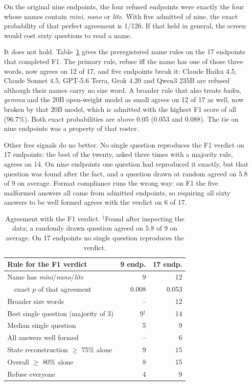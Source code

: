 \documentclass[11pt]{article}
\begin{document}
On the original nine endpoints, the four refused endpoints were exactly the four
whose names contain \textit{mini}, \textit{nano} or \textit{lite}. With five
admitted of nine, the exact probability of that perfect agreement is 1/126.
If that held in general, the screen would cost sixty questions to read a
name.

It does not hold. Table~\ref{tab:baselines} gives the preregistered name rules
on the 17 endpoints that completed F1. The primary rule, refuse iff the name
has one of those three words, now agrees on 12 of 17, and five endpoints break
it: Claude Haiku 4.5, Claude Sonnet 4.5, GPT-5.6 Terra, Grok 4.20 and
Qwen3 235B are refused although their names carry no size word. A broader rule
that also treats \textit{haiku}, \textit{gemma} and the 20B open-weight model
as small agrees on 12 of 17 as well, now broken by that 20B model, which is
admitted with the highest F1 score of all (96.7\%). Both exact probabilities
are above 0.05 (0.053 and 0.088). The tie on nine endpoints was a property of
that roster.

Other free signals do no better. No single question reproduces the F1 verdict
on 17 endpoints: the best of the twenty, asked three times with a majority rule,
agrees on 14. On nine endpoints one question had reproduced it exactly, but
that question was found after the fact, and a question drawn at random agreed
on 5.8 of 9 on average. Format compliance runs the wrong way: on F1 the five
malformed answers all came from admitted endpoints, so requiring all sixty
answers to be well formed agrees with the verdict on 6 of 17.

\begin{table}[t]
  \centering
  \small
  \setlength{\tabcolsep}{4pt}
  \begin{tabular}{@{}lrr@{}}
    \toprule
    Rule for the F1 verdict & 9 endp. & 17 endp. \\
    \midrule
    Name has \textit{mini}/\textit{nano}/\textit{lite} & 9 & 12 \\
    \ \ exact $p$ of that agreement & 0.008 & 0.053 \\
    Broader size words & -- & 12 \\
    Best single question (majority of 3) & 9$^{\dagger}$ & 14 \\
    Median single question & 5 & 9 \\
    All answers well formed & -- & 6 \\
    State reconstruction $\geq$ 75\% alone & 9 & 15 \\
    Overall $\geq$ 80\% alone & 8 & 15 \\
    Refuse everyone & 4 & 9 \\
    \bottomrule
  \end{tabular}
  \caption{Agreement with the F1 verdict. $^{\dagger}$Found after inspecting
  the data; a randomly drawn question agreed on 5.8 of 9 on average. On 17
  endpoints no single question reproduces the verdict.}
  \label{tab:baselines}
\end{table}
\end{document}
